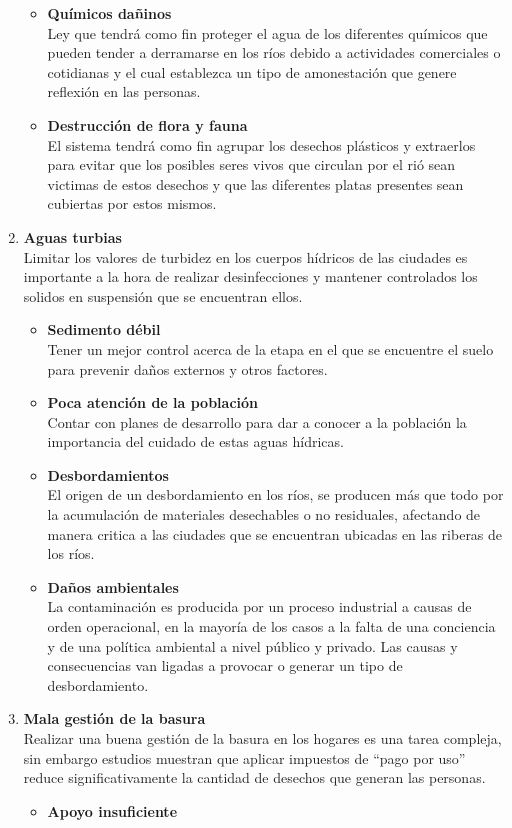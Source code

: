 \begin{enumerate}
\begin{itemize}
		      \item \textbf{Químicos dañinos}\\
		            Ley que tendrá como fin  proteger el agua de los diferentes químicos que pueden tender a derramarse en los ríos debido a actividades comerciales o cotidianas y el cual establezca un tipo de amonestación que genere reflexión en las personas.
		      \item \textbf{Destrucción de flora y fauna}\\
		            El sistema tendrá como fin agrupar los desechos plásticos y extraerlos para evitar que los posibles seres vivos que circulan por el rió sean victimas de estos desechos y que las diferentes platas presentes sean cubiertas por estos mismos.
	      \end{itemize}
	\item \textbf{Aguas turbias}\\
	      Limitar los valores de turbidez en los cuerpos hídricos de las ciudades es importante a la hora de realizar desinfecciones y mantener controlados los solidos en suspensión que se encuentran ellos.
	      \begin{itemize}
		      \item \textbf{Sedimento débil} \\
		            Tener un mejor control acerca de la etapa en el que se encuentre el suelo para prevenir daños externos y otros factores.
		      \item \textbf{Poca atención de la población}\\
		            Contar con planes de desarrollo para dar a conocer a la población la importancia del cuidado de estas aguas hídricas.
		      \item \textbf{Desbordamientos} \\
		            El origen de un desbordamiento en los ríos, se producen más que todo por la acumulación de materiales desechables o no residuales, afectando de manera critica a las ciudades que se encuentran ubicadas en las riberas de los ríos.
		      \item \textbf{Daños ambientales}\\
		            La contaminación es producida por un proceso industrial a causas de orden operacional, en la mayoría de los casos a la falta de una conciencia y de una política ambiental a nivel público y privado. Las causas y consecuencias van ligadas a provocar o generar un tipo de desbordamiento.
	      \end{itemize}
	\item \textbf{Mala gestión de la basura}\\
	      Realizar una buena gestión de la basura en los hogares es una tarea compleja, sin embargo estudios muestran que aplicar impuestos de ``pago por uso'' reduce significativamente la cantidad de desechos que generan las personas.
	      \begin{itemize}
		      \item  \textbf{Apoyo insuficiente}\\


\end{itemize}
\end{enumerate}
